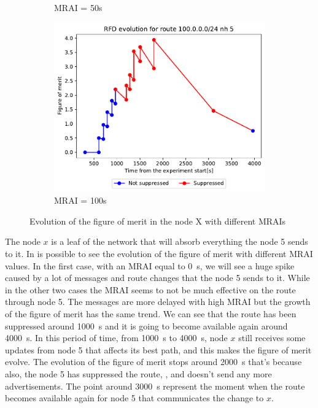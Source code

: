 \begin{figure}[h]
\begin{subfigure}[b]{0.3\textwidth}
         \caption{MRAI = 50s}
         \label{fig:clique_x_mrai50}
     \end{subfigure}
     \hfill
     \begin{subfigure}[b]{0.3\textwidth}
         \centering
         \includegraphics[width=\textwidth]{images/RFD/clique/FigureOfMerit/mrai21_RFD_x_rfd_R1.pdf}
         \caption{MRAI = 100s}
         \label{fig:clique_x_mrai100}
     \end{subfigure}
        \caption{Evolution of the figure of merit in the node X with different MRAIs}
        \label{fig:clique_nodex}
\end{figure}

The node $x$ is a leaf of the network that will absorb everything the node \num{5}
sends to it.
In  is possible to see the evolution of the figure of merit
with different \ac{MRAI} values.
In the first case, with an \ac{MRAI} equal to \SI{0}{\second}, we will see a huge
spike caused by a lot of messages and route changes that the node \num{5} sends
to it.
While in the other two cases 
the \ac{MRAI} seems to not be much effective on the route through node \num{5}.
The messages are more delayed with high \ac{MRAI} but the growth of the figure
of merit has the same trend.
We can see that the route has been suppressed around \SI{1000}{\second}
and it is going to become available again around \SI{4000}{\second}.
In this period of time, from \SI{1000}{\second} to \SI{4000}{\second}, node $x$ still
receives some updates from node \num{5} that affects its best path, and this
makes the figure of merit evolve.
The evolution of the figure of merit stops around \SI{2000}{\second} that's because
also, the node \num{5} has suppressed the route, , and
doesn't send any more advertisements.
The point around \SI{3000}{\second} represent the moment when the route becomes
available again for node \num{5} that communicates the change to $x$.

